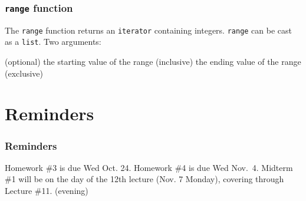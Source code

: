 \documentclass[11pt]{beamer}
\begin{document}
\begin{frame}[fragile]
  \frametitle{\texttt{range} function}
  \Enlarge

  \begin{itemize}
  \myitem  The \texttt{range} function returns an \texttt{iterator} containing integers. %
  \myitem  \texttt{range} can be cast as a \texttt{list}. %
  \myitem  Two arguments:
    \begin{itemize}
    \mysubitem  (optional) the starting value of the range (inclusive)
    \mysubitem  the ending value of the range (exclusive)
    \end{itemize}
  \end{itemize}
\end{frame}

\section{Reminders}

\begin{frame}
  \frametitle{Reminders}
  \Enlarge

  \begin{itemize}
  \myitem  Homework \#3 is due Wed Oct. 24.
  \myitem  Homework \#4 is due Wed Nov.\ 4.
  \myitem Midterm \#1 will be on the day of the 12th lecture (Nov. 7 Monday), covering through Lecture \#11. (evening)
  \end{itemize}
\end{frame}
\end{document}
